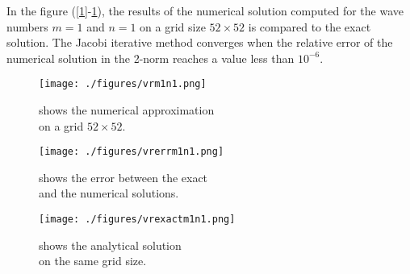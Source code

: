 In the figure (\ref{1}-\ref{3}), the results of the numerical solution computed for the wave numbers $m = 1$ and $n = 1$ on a grid size $52\times52$ is compared to the exact solution. The Jacobi iterative method converges when the relative error of the numerical solution in the 2-norm reaches a value less than $10^{-6}$.
\begin{figure}[h]
\footnotesize
\begin{minipage}[h]{.5\textwidth }
\texttt{[image: ./figures/vrm1n1.png]}
\caption{shows the numerical approximation \\
  on a grid $52\times52$.}
\label{1}
\end{minipage}
\begin{minipage}[h]{.5\textwidth}
\texttt{[image: ./figures/vrerrm1n1.png]}
\caption{shows the error between the exact \\
and the numerical solutions.}
\label{2}
\end{minipage}
\begin{minipage}[h]{.5\textwidth}
\texttt{[image: ./figures/vrexactm1n1.png]}
\caption{shows the analytical solution \\
on the same grid size.}
\label{3}
\end{minipage}
\end{figure}

